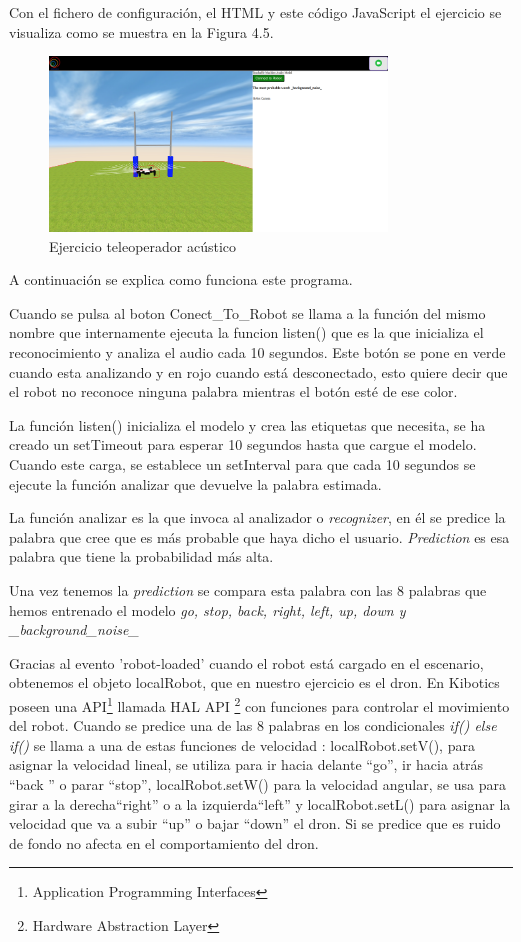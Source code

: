 Con el fichero de configuración, el HTML y este código JavaScript el ejercicio se visualiza como se muestra en la Figura 4.5.

\begin{figure}[H]
    \centering
    \includegraphics[width=0.8\textwidth, height=0.4\textwidth]{chapters/images/audio.png}
    \caption{Ejercicio teleoperador acústico}
    \label{fig:my_label}
\end{figure}

A continuación se explica como funciona este programa.

Cuando se pulsa al boton Conect\_To\_Robot se llama a la función del mismo nombre que internamente ejecuta  la funcion listen() que es la que inicializa el reconocimiento y analiza el audio cada 10 segundos.
Este botón se pone en verde cuando esta analizando y en rojo cuando está desconectado, esto quiere decir que el robot no reconoce ninguna palabra mientras el botón esté de ese color.

La función listen() inicializa el modelo y crea las etiquetas que necesita, se ha creado un setTimeout para esperar 10 segundos hasta que cargue el modelo. Cuando este carga, se establece un setInterval para que cada 10 segundos se ejecute la función analizar que devuelve la palabra estimada.

La función analizar es la que invoca al analizador o \textit{recognizer}, en él se predice la palabra que cree que es más probable que haya dicho el usuario.  \textit{Prediction} es esa palabra que tiene  la probabilidad más alta.

Una vez tenemos la \textit{prediction} se compara esta palabra con las 8 palabras que hemos entrenado el modelo \textit{go, stop, back, right, left, up, down y \_background\_noise\_}

Gracias al evento 'robot-loaded' cuando el robot está cargado en el escenario,  obtenemos el objeto localRobot, que en nuestro ejercicio es el dron. En Kibotics poseen una API\footnote{Application Programming Interfaces} llamada HAL API \footnote{Hardware Abstraction Layer} con funciones para controlar el movimiento del robot.  Cuando se predice una de las 8 palabras en los condicionales \textit{if(){} else if() {}}se llama a una de estas funciones de velocidad : localRobot.setV(), para asignar la velocidad lineal, se utiliza para ir hacia delante ``go'', ir hacia atrás ``back '' o parar ``stop'',  localRobot.setW() para la velocidad angular, se usa para girar a la derecha``right'' o a la izquierda``left'' y  localRobot.setL() para asignar la velocidad que va a subir ``up'' o bajar ``down'' el dron. Si se predice que es ruido de fondo no afecta en el comportamiento del dron.


